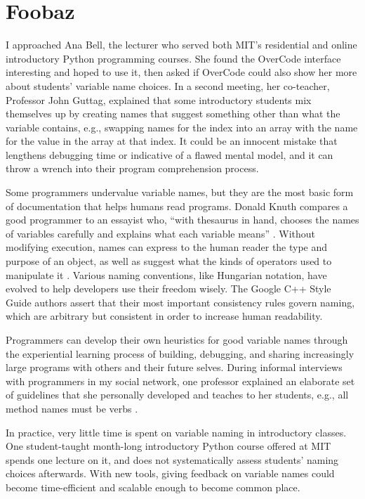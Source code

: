 \section{Foobaz}

I approached Ana Bell, the lecturer who served both MIT's residential and online introductory Python programming courses. She found the OverCode interface interesting and hoped to use it, then asked if OverCode could also show her more about students' variable name choices. In a second meeting, her co-teacher, Professor John Guttag, explained that some introductory students mix themselves up by creating names that suggest something other than what the variable contains, e.g., swapping names for the index into an array with the name for the value in the array at that index. It could be an innocent mistake that lengthens debugging time or indicative of a flawed mental model, and it can throw a wrench into their program comprehension process. 

Some programmers undervalue variable names, but they are the most basic form of documentation that helps humans read programs. Donald Knuth compares a good programmer to an essayist who, ``with thesaurus in hand, chooses the names of variables carefully and explains what each variable means'' \cite{literateprogramming}. Without modifying execution, names can express to the human reader the type and purpose of an object, as well as suggest what the kinds of operators used to manipulate it \cite{operands}. Various naming conventions, like Hungarian notation, have evolved to help developers use their freedom wisely. The Google C++ Style Guide authors assert that their most important consistency rules govern naming, which are arbitrary but consistent in order to increase human readability. 

Programmers can develop their own heuristics for good variable names through the experiential learning process of building, debugging, and sharing increasingly large programs with others and their future selves. During informal interviews with programmers in my social network, one professor explained an elaborate set of guidelines that she personally developed and teaches to her students, e.g., all method names must be verbs \cite{doshiconversation}.

In practice, very little time is spent on variable naming in introductory classes. One student-taught month-long introductory Python course offered at MIT spends one lecture on it, and does not systematically assess students' naming choices afterwards. With new tools, giving feedback on variable names could become time-efficient and scalable enough to become common place. 

